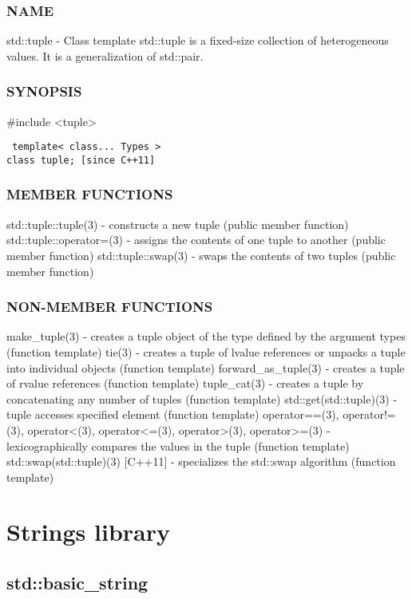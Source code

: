 \subsubsection{NAME}
std::tuple - Class template std::tuple is a fixed-size collection of heterogeneous values. It is a generalization of std::pair.

\subsubsection{SYNOPSIS}
\#include <tuple>

\begin{lstlisting}
 template< class... Types >
class tuple; [since C++11]
\end{lstlisting}

\subsubsection{MEMBER FUNCTIONS}
std::tuple::tuple(3) - constructs a new tuple  (public member function)
std::tuple::operator=(3) - assigns the contents of one tuple to another  (public member function)
std::tuple::swap(3) - swaps the contents of two tuples   (public member function)

\subsubsection{NON-MEMBER FUNCTIONS}
make\_tuple(3) - creates a tuple object of the type defined by the argument types  (function template)
tie(3) - creates a tuple of lvalue references or unpacks a tuple into individual objects  (function template)
forward\_as\_tuple(3) - creates a tuple of rvalue references  (function template)
tuple\_cat(3) - creates a tuple by concatenating any number of tuples  (function template)
std::get(std::tuple)(3) - tuple accesses specified element  (function template)
operator==(3), operator!=(3), operator<(3), operator<=(3), operator>(3), operator>=(3) - lexicographically compares the values in the tuple   (function template)
std::swap(std::tuple)(3) [C++11] - specializes the std::swap algorithm   (function template)


\section{Strings library}

\subsection{std::basic\_string}

